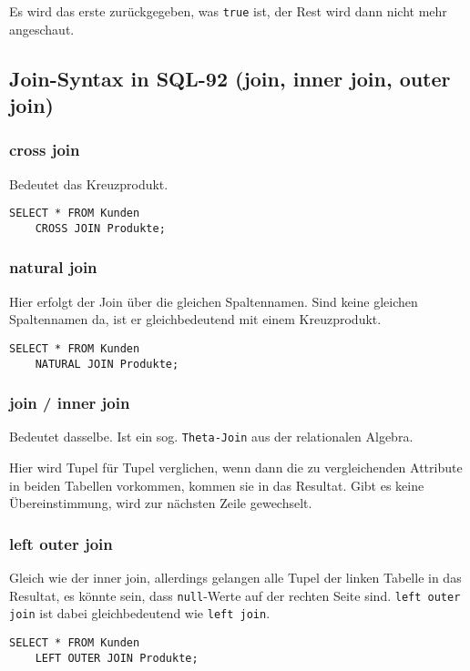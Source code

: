Es wird das erste zurückgegeben, was \texttt{true} ist, der Rest wird dann nicht mehr angeschaut.

\subsection{Join-Syntax in SQL-92 (join, inner join, outer join)}
\label{sec:join}

\subsubsection{cross join}
Bedeutet das Kreuzprodukt.
\begin{lstlisting}[caption={Cross Join}]
    SELECT * FROM Kunden
    CROSS JOIN Produkte;
\end{lstlisting}

\subsubsection{natural join}
Hier erfolgt der Join über die gleichen Spaltennamen. Sind keine gleichen Spaltennamen da, ist er gleichbedeutend mit einem Kreuzprodukt.
\begin{lstlisting}[caption={Natural Join}]
    SELECT * FROM Kunden
    NATURAL JOIN Produkte;
\end{lstlisting}

\subsubsection{join / inner join}
Bedeutet dasselbe. Ist ein sog. \texttt{Theta-Join} aus der relationalen Algebra.


Hier wird Tupel für Tupel verglichen, wenn dann die zu vergleichenden Attribute in beiden Tabellen vorkommen, kommen sie in das Resultat. Gibt es keine Übereinstimmung, wird zur nächsten Zeile gewechselt.


\subsubsection{left outer join}
Gleich wie der inner join, allerdings gelangen alle Tupel der linken Tabelle in das Resultat, es könnte sein, dass \texttt{null}-Werte auf der rechten Seite sind. \texttt{left outer join} ist dabei gleichbedeutend wie \texttt{left join}.

\begin{lstlisting}[caption={Left Join SQL}]
    SELECT * FROM Kunden
    LEFT OUTER JOIN Produkte;
\end{lstlisting}

